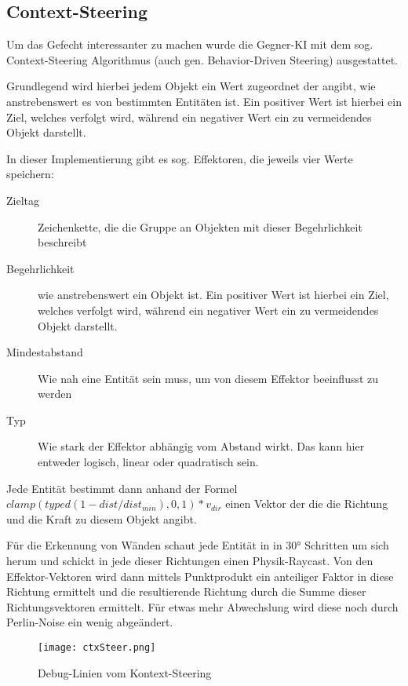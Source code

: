 \lipsum[3]



\subsection{Context-Steering}

Um das Gefecht interessanter zu machen wurde die Gegner-KI mit dem sog. Context-Steering Algorithmus\cite{qCtxSteer} (auch gen. Behavior-Driven Steering) ausgestattet.

Grundlegend wird hierbei jedem Objekt ein Wert zugeordnet der angibt, wie anstrebenswert es von bestimmten Entitäten ist. Ein positiver Wert ist hierbei ein Ziel, welches verfolgt wird, während ein negativer Wert ein zu vermeidendes Objekt darstellt.

In dieser Implementierung gibt es sog. Effektoren, die jeweils vier Werte speichern:

\begin{description}
\item[Zieltag] Zeichenkette, die die Gruppe an Objekten mit dieser Begehrlichkeit beschreibt
\item[Begehrlichkeit] wie anstrebenswert ein Objekt ist. Ein positiver Wert ist hierbei ein Ziel, welches verfolgt wird, während ein negativer Wert ein zu vermeidendes Objekt darstellt.
\item[Mindestabstand] Wie nah eine Entität sein muss, um von diesem Effektor beeinflusst zu werden
\item[Typ] Wie stark der Effektor abhängig vom Abstand wirkt. Das kann hier entweder logisch, linear oder quadratisch sein. 
\end{description}

Jede Entität bestimmt dann anhand der Formel $ clamp(typed(1 - dist / dist_{min}), 0, 1) * v_{dir} $ einen Vektor der die die Richtung und die Kraft zu diesem Objekt angibt.

Für die Erkennung von Wänden schaut jede Entität in in 30° Schritten um sich herum und schickt in jede dieser Richtungen einen Physik-Raycast. Von den Effektor-Vektoren wird dann  mittels Punktprodukt ein anteiliger Faktor in diese Richtung ermittelt und die resultierende Richtung durch die Summe dieser Richtungsvektoren ermittelt. Für etwas mehr Abwechslung wird diese noch durch Perlin-Noise ein wenig abgeändert.

\begin{figure}[H]
\centering
\texttt{[image: ctxSteer.png]}
\caption{Debug-Linien vom Kontext-Steering}
\label{img:ctxSteer}
\end{figure}

